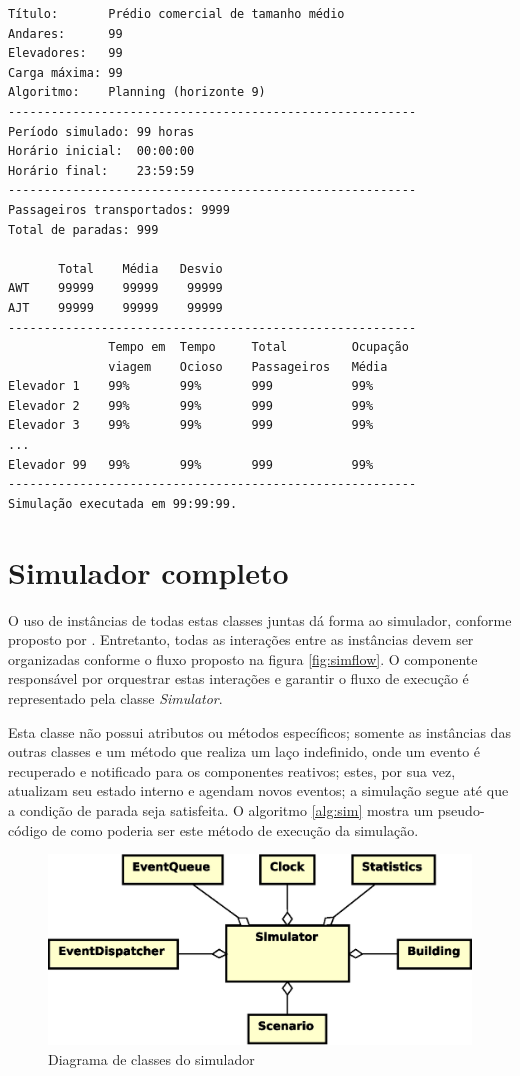 \begin{lstlisting}
Título:       Prédio comercial de tamanho médio
Andares:      99
Elevadores:   99
Carga máxima: 99
Algoritmo:    Planning (horizonte 9)
---------------------------------------------------------
Período simulado: 99 horas
Horário inicial:  00:00:00
Horário final:    23:59:59
---------------------------------------------------------
Passageiros transportados: 9999
Total de paradas: 999

       Total    Média   Desvio
AWT    99999    99999    99999
AJT    99999    99999    99999
---------------------------------------------------------
              Tempo em  Tempo     Total         Ocupação
              viagem    Ocioso    Passageiros   Média
Elevador 1    99%       99%       999           99%
Elevador 2    99%       99%       999           99%
Elevador 3    99%       99%       999           99%
...
Elevador 99   99%       99%       999           99%
---------------------------------------------------------
Simulação executada em 99:99:99.
\end{lstlisting}

\section{Simulador completo}

O uso de instâncias de todas estas classes juntas dá forma ao simulador,
conforme proposto por \cite{Law,Banks}. Entretanto, todas as interações entre as
instâncias devem ser organizadas conforme o fluxo proposto na figura
\ref{fig:simflow}. O componente responsável por orquestrar estas interações e
garantir o fluxo de execução é representado pela classe \textit{Simulator}.

Esta classe não possui atributos ou métodos específicos; somente as instâncias
das outras classes e um método que realiza um laço indefinido, onde um evento é
recuperado e notificado para os componentes reativos; estes, por sua vez,
atualizam seu estado interno e agendam novos eventos; a simulação segue até que
a condição de parada seja satisfeita. O algoritmo \ref{alg:sim} mostra um
pseudo-código de como poderia ser este método de execução da simulação.

\begin{figure}[htb!]
  \centering
  \includegraphics[scale=0.6]{img/Simulator.eps}
  \caption{Diagrama de classes do simulador}
\label{fig:diagram:simulator}
\end{figure}

